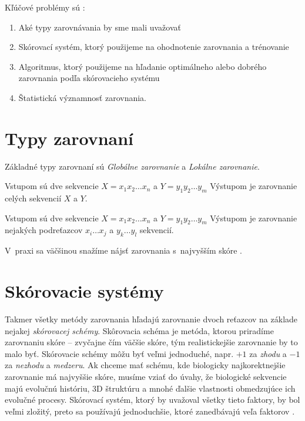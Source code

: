 Kľúčové problémy sú \cite{durbin}:
\begin{enumerate}
\item Aké typy zarovnávania by sme mali uvažovať
\item Skórovací systém, ktorý použijeme na ohodnotenie zarovnania a trénovanie
\item Algoritmus, ktorý použijeme na hľadanie optimálneho alebo dobrého zarovnania podľa skórovacieho systému
\item Štatistická významnosť zarovnania.
\end{enumerate}

\section{Typy zarovnaní}
Základné typy zarovnaní sú \textit{Globálne zarovnanie} a \textit{Lokálne zarovnanie}.
\begin{df}
Vstupom sú dve sekvencie $X = x_1x_2\dots x_n$ a $Y = y_1y_2\dots y_m$
Výstupom je zarovnanie celých sekvencií $X$ a $Y$.
\end{df}
\begin{df}
Vstupom sú dve sekvencie $X = x_1x_2\dots x_n$ a $Y = y_1y_2\dots y_m$
Výstupom je zarovnanie nejakých podreťazcov $x_i\dots x_j$ a $y_k\dots y_l$ sekvencií.
\end{df}
V~praxi sa väčšinou snažíme nájsť zarovnania s~najvyšším skóre \cite{skripta}.

\section{Skórovacie systémy}
Takmer všetky metódy zarovnania hľadajú zarovnanie dvoch reťazcov na základe nejakej \textit{skórovacej schémy}. Skôrovacia schéma je metóda, ktorou priradíme zarovnaniu skóre -- zvyčajne čím väčšie skóre, tým realistickejšie zarovnanie by to malo byť.
Skórovacie schémy môžu byť veľmi jednoduché, napr. $+1$ za \textit{zhodu} a $-1$ za \textit{nezhodu} a \textit{medzeru}.
Ak chceme mať schému, kde biologicky najkorektnejšie zarovnanie má najvyššie skóre, musíme vziať do úvahy, že biologické sekvencie majú evolučnú históriu, 3D štruktúru a mnohé ďalšie vlastnosti obmedzujúce ich evolučné procesy. Skórovací systém, ktorý by uvažoval všetky tieto faktory, by bol veľmi zložitý, preto sa používajú jednoduchšie, ktoré zanedbávajú veľa faktorov \cite{durbin}.

